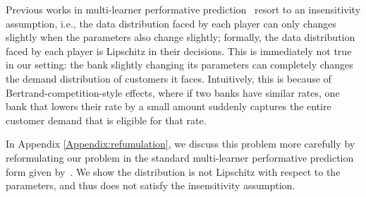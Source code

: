 \begin{Remark}
   Previous works in multi-learner performative prediction~\citep{narang2023multiplayer} resort to an insensitivity assumption, i.e., the data distribution faced by each player can only changes slightly when the parameters also change slightly; formally, the data distribution faced by each player is Lipschitz in their decisions. This is immediately not true in our setting: the bank slightly changing its parameters can completely changes the demand distribution of customers it faces. Intuitively, this is because of Bertrand-competition-style effects, where if two banks have similar rates, one bank that lowers their rate by a small amount suddenly captures the entire customer demand that is eligible for that rate.%
   
   In Appendix \ref{Appendix:refumulation}, we discuss this problem more carefully by reformulating our problem in the standard multi-learner performative prediction form given by~\citep{narang2023multiplayer}. We show the distribution is not Lipschitz with respect to the parameters, and thus does not satisfy the insensitivity assumption. 
     
\end{Remark}





